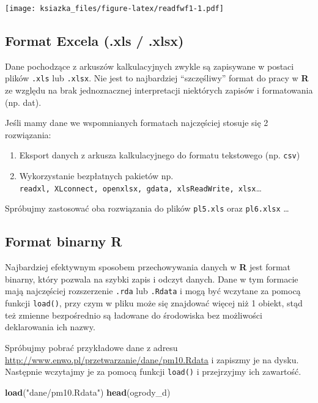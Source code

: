 \documentclass[]{book}
\newenvironment{Shaded}{\begin{snugshade}}{\end{snugshade}}
\newcommand{\KeywordTok}[1]{\textcolor[rgb]{0.13,0.29,0.53}{\textbf{#1}}}
\newcommand{\StringTok}[1]{\textcolor[rgb]{0.31,0.60,0.02}{#1}}
\newcommand{\NormalTok}[1]{#1}
\providecommand{\tightlist}{%
  \setlength{\itemsep}{0pt}\setlength{\parskip}{0pt}}
\theoremstyle{definition}
\theoremstyle{definition}
\theoremstyle{definition}
\theoremstyle{remark}
\begin{document}
\texttt{[image: ksiazka\_files/figure-latex/readfwf1-1.pdf]}

\subsection{Format Excela (.xls /
.xlsx)}\label{format-excela-.xls-.xlsx}

Dane pochodzące z arkuszów kalkulacyjnych zwykle są zapisywane w postaci
plików \texttt{.xls} lub \texttt{.xlsx}. Nie jest to najbardziej
``szczęśliwy'' format do pracy w \textbf{R} ze względu na brak
jednoznacznej interpretacji niektórych zapisów i formatowania (np. dat).

Jeśli mamy dane we wspomnianych formatach najczęściej stosuje się 2
rozwiązania:

\begin{enumerate}
\def\labelenumi{\arabic{enumi}.}
\tightlist
\item
  Eksport danych z arkusza kalkulacyjnego do formatu tekstowego (np.
  \texttt{csv})
\item
  Wykorzystanie bezpłatnych pakietów np.
  \texttt{readxl,\ XLconnect,\ openxlsx,\ gdata,\ xlsReadWrite,\ xlsx}\ldots{}
\end{enumerate}

Spróbujmy zastosować oba rozwiązania do plików \texttt{pl5.xls} oraz
\texttt{pl6.xlsx} \ldots{}

\subsection{\texorpdfstring{Format binarny
\textbf{R}}{Format binarny R}}\label{format-binarny-r}

Najbardziej efektywnym sposobem przechowywania danych w \textbf{R} jest
format binarny, który pozwala na szybki zapis i odczyt danych. Dane w
tym formacie mają najczęściej rozszerzenie \texttt{.rda} lub
\texttt{.Rdata} i mogą być wczytane za pomocą funkcji \texttt{load()},
przy czym w pliku może się znajdować więcej niż 1 obiekt, stąd też
zmienne bezpośrednio są ładowane do środowiska bez możliwości
deklarowania ich nazwy.

Spróbujmy pobrać przykładowe dane z adresu
\url{http://www.enwo.pl/przetwarzanie/dane/pm10.Rdata} i zapiszmy je na
dysku. Następnie wczytajmy je za pomocą funkcji \texttt{load()} i
przejrzyjmy ich zawartość.

\begin{Shaded}
\begin{Highlighting}[]
\KeywordTok{load}\NormalTok{(}\StringTok{"dane/pm10.Rdata"}\NormalTok{)}
\KeywordTok{head}\NormalTok{(ogrody_d)}
\end{Highlighting}
\end{Shaded}
\end{document}
